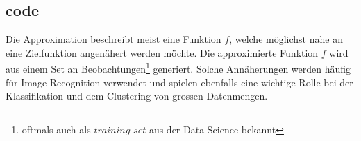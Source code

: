 \subsection{code}
Die Approximation beschreibt meist eine Funktion $f$, welche möglichst nahe an eine Zielfunktion angenähert werden
möchte. Die approximierte Funktion $f$ wird aus einem Set an Beobachtungen\footnote{oftmals auch als $training$ $set$ aus
der Data Science bekannt} generiert. Solche Annäherungen werden häufig für Image Recognition verwendet
und spielen ebenfalls eine wichtige Rolle bei der Klassifikation und dem Clustering von grossen Datenmengen.